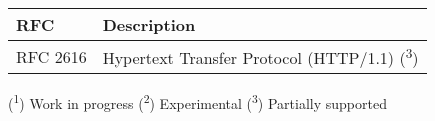 
\begin{longtable}{ | l | p{15cm} | }
\hline
{\bf RFC} & 
{\bf Description} \\ \hline 

RFC 2616 &
Hypertext Transfer Protocol (HTTP/1.1) (\textsuperscript{3})\\ \hline

\end{longtable}

(\textsuperscript{1}) Work in progress
(\textsuperscript{2}) Experimental
(\textsuperscript{3}) Partially supported
